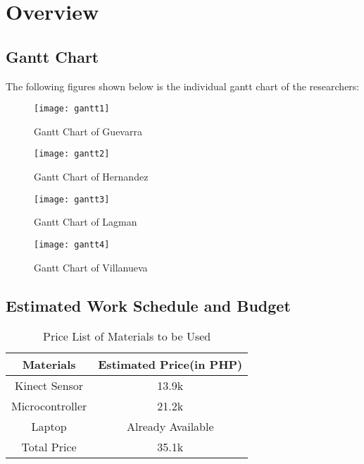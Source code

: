 \section{Overview}

\subsection{Gantt Chart}
The following figures shown below is the individual gantt chart of the researchers:

\begin{figure}[!htb]
	\centering
	\texttt{[image: gantt1]}
	\caption{Gantt Chart of Guevarra}
\end{figure}
\begin{figure}[!htb]
	\centering
	\texttt{[image: gantt2]}
	\caption{Gantt Chart of Hernandez}
\end{figure}
\begin{figure}[!htb]
	\centering
	\texttt{[image: gantt3]}
	\caption{Gantt Chart of Lagman}
\end{figure}
\begin{figure}[!htb]
	\centering
	\texttt{[image: gantt4]}
	\caption{Gantt Chart of Villanueva}
\end{figure}
\newpage
\newpage
\subsection{Estimated Work Schedule and Budget}
\begin{table}[!htb]
	\caption{Price List of Materials to be Used}
	\centering
	\begin{tabular}{|c|c|}
		\hline
		Materials & Estimated Price(in PHP) \\
		\hline
		Kinect Sensor & 13.9k \\
		\hline
		Microcontroller & 21.2k \\
		\hline
		Laptop & Already Available \\
		\hline
		Total Price & 35.1k \\
		\hline
	\end{tabular}
\end{table}